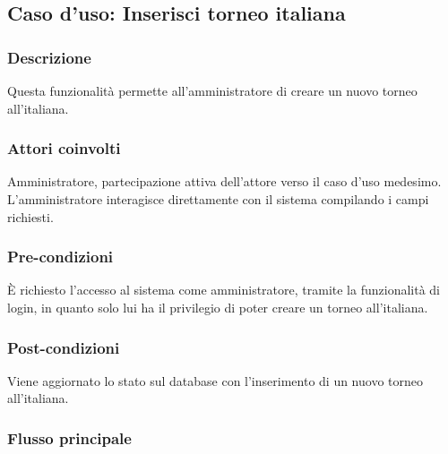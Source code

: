 %
%
\subsection{Caso d'uso: Inserisci torneo italiana}

\subsubsection*{Descrizione}
Questa funzionalità permette all'amministratore di creare un nuovo torneo all'italiana.

\subsubsection*{Attori coinvolti}
Amministratore, partecipazione attiva dell'attore verso il caso d'uso medesimo.
L'amministratore interagisce direttamente con il sistema compilando i campi richiesti.

\subsubsection*{Pre-condizioni}
È richiesto l'accesso al sistema come amministratore, tramite la funzionalità di login, in quanto solo lui ha il privilegio di poter creare un torneo all'italiana.

\subsubsection*{Post-condizioni}
Viene aggiornato lo stato sul database con l'inserimento di un nuovo torneo all'italiana.

\subsubsection*{Flusso principale}

